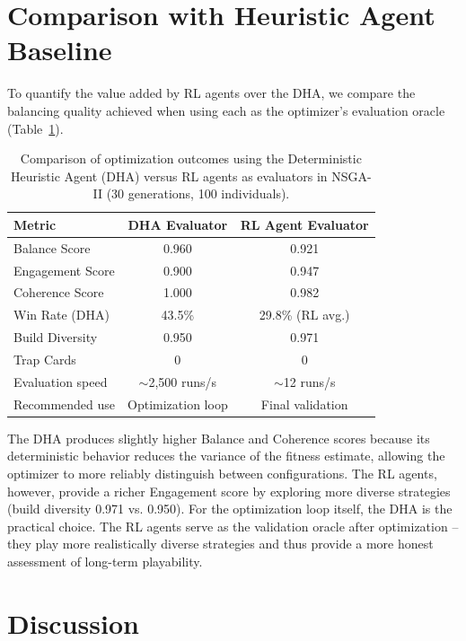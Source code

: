 \section{Comparison with Heuristic Agent Baseline}

To quantify the value added by RL agents over the DHA, we compare the balancing quality achieved when using each as the optimizer's evaluation oracle (Table~\ref{tab:dha_vs_rl}).

\begin{table}[H]
    \centering
    \caption{Comparison of optimization outcomes using the Deterministic Heuristic Agent (DHA) versus RL agents as evaluators in NSGA-II (30 generations, 100 individuals).}
    \label{tab:dha_vs_rl}
    \begin{tabular}{lcc}
        \toprule
        \textbf{Metric}          & \textbf{DHA Evaluator} & \textbf{RL Agent Evaluator} \\
        \midrule
        Balance Score            & 0.960 & 0.921 \\
        Engagement Score         & 0.900 & 0.947 \\
        Coherence Score          & 1.000 & 0.982 \\
        Win Rate (DHA)           & 43.5\% & 29.8\% (RL avg.) \\
        Build Diversity          & 0.950 & 0.971 \\
        Trap Cards               & 0 & 0 \\
        Evaluation speed         & $\sim$2,500 runs/s & $\sim$12 runs/s \\
        Recommended use          & Optimization loop & Final validation \\
        \bottomrule
    \end{tabular}
\end{table}

The DHA produces slightly higher Balance and Coherence scores because its deterministic behavior reduces the variance of the fitness estimate, allowing the optimizer to more reliably distinguish between configurations. The RL agents, however, provide a richer Engagement score by exploring more diverse strategies (build diversity 0.971 vs. 0.950). For the optimization loop itself, the DHA is the practical choice. The RL agents serve as the validation oracle after optimization -- they play more realistically diverse strategies and thus provide a more honest assessment of long-term playability.

\section{Discussion}


